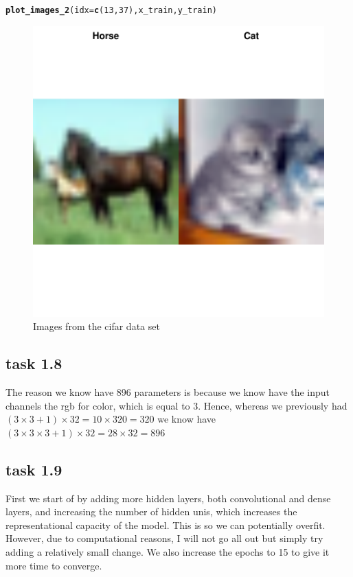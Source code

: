 \documentclass[10pt, a4paper, english]{article}\usepackage[]{graphicx}\usepackage[dvipsnames]{xcolor}
\makeatletter
\def\maxwidth{ %
  \ifdim\Gin@nat@width>\linewidth
    \linewidth
  \else
    \Gin@nat@width
  \fi
}
\newcommand{\hlnum}[1]{\textcolor[rgb]{0.686,0.059,0.569}{#1}}%
\newcommand{\hlstd}[1]{\textcolor[rgb]{0.345,0.345,0.345}{#1}}%
\newcommand{\hlkwc}[1]{\textcolor[rgb]{0.333,0.667,0.333}{#1}}%
\newcommand{\hlkwd}[1]{\textcolor[rgb]{0.737,0.353,0.396}{\textbf{#1}}}%
\newenvironment{kframe}{%
 \def\at@end@of@kframe{}%
 \ifinner\ifhmode%
  \def\at@end@of@kframe{\end{minipage}}%
  \begin{minipage}{\columnwidth}%
 \fi\fi%
 \def\FrameCommand##1{\hskip\@totalleftmargin \hskip-\fboxsep
 \colorbox{shadecolor}{##1}\hskip-\fboxsep
     \hskip-\linewidth \hskip-\@totalleftmargin \hskip\columnwidth}%
 \MakeFramed {\advance\hsize-\width
   \@totalleftmargin\z@ \linewidth\hsize
   \@setminipage}}%
 {\par\unskip\endMakeFramed%
 \at@end@of@kframe}
\newenvironment{knitrout}{}{} %
\makeatother
\begin{document}
\begin{knitrout}
\color{fgcolor}\begin{kframe}
\begin{alltt}
\hlkwd{plot_images_2}\hlstd{(}\hlkwc{idx} \hlstd{=} \hlkwd{c}\hlstd{(}\hlnum{13}\hlstd{,} \hlnum{37}\hlstd{), x_train, y_train)}
\end{alltt}
\end{kframe}\begin{figure}
\includegraphics[width=\maxwidth]{figure/unnamed-chunk-21-1} \caption[Images from the cifar data set]{Images from the cifar data set}\label{fig:unnamed-chunk-21}
\end{figure}

\end{knitrout}
\subsection{task 1.8}
The reason we know have 896 parameters is because we know have the input channels the rgb for color, which is equal to 3. Hence, whereas we previously had $(3 \times 3 + 1) \times 32 = 10 \times 320 = 320$  we know have $(3 \times 3 \times 3+ 1) \times 32 = 28 \times 32 = 896$ 

\subsection{task 1.9}
First we start of by adding more hidden layers, both convolutional and dense layers, and increasing the number of hidden unis, which increases the representational capacity of the model. This is so we can potentially overfit. However, due to computational reasons, I will not go all out but simply try adding a relatively small change. We also increase the epochs to 15 to give it more time to converge. 
\end{document}
